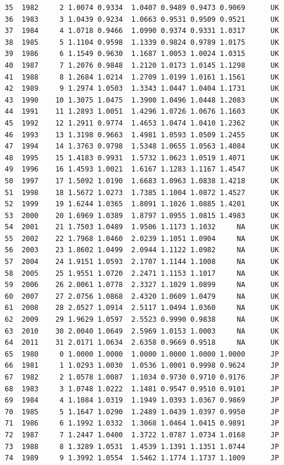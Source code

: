\documentclass[preprint,authoryear,12pt]{elsarticle}\usepackage{graphicx, color}
\makeatletter
\newenvironment{kframe}{%
 \def\at@end@of@kframe{}%
 \ifinner\ifhmode%
  \def\at@end@of@kframe{\end{minipage}}%
  \begin{minipage}{\columnwidth}%
 \fi\fi%
 \def\FrameCommand##1{\hskip\@totalleftmargin \hskip-\fboxsep
 \colorbox{shadecolor}{##1}\hskip-\fboxsep
     \hskip-\linewidth \hskip-\@totalleftmargin \hskip\columnwidth}%
 \MakeFramed {\advance\hsize-\width
   \@totalleftmargin\z@ \linewidth\hsize
   \@setminipage}}%
 {\par\unskip\endMakeFramed%
 \at@end@of@kframe}
\newenvironment{knitrout}{}{} %
\makeatother
\begin{document}
\begin{knitrout}
\begin{kframe}
\begin{verbatim}
35  1982     2 1.0074 0.9334  1.0407 0.9489 0.9473 0.9069      UK
36  1983     3 1.0439 0.9234  1.0663 0.9531 0.9509 0.9521      UK
37  1984     4 1.0718 0.9466  1.0990 0.9374 0.9331 1.0317      UK
38  1985     5 1.1104 0.9598  1.1339 0.9824 0.9789 1.0175      UK
39  1986     6 1.1549 0.9630  1.1687 1.0053 1.0024 1.0315      UK
40  1987     7 1.2076 0.9848  1.2120 1.0173 1.0145 1.1298      UK
41  1988     8 1.2684 1.0214  1.2709 1.0199 1.0161 1.1561      UK
42  1989     9 1.2974 1.0503  1.3343 1.0447 1.0404 1.1731      UK
43  1990    10 1.3075 1.0475  1.3900 1.0496 1.0448 1.2083      UK
44  1991    11 1.2893 1.0051  1.4296 1.0726 1.0676 1.1603      UK
45  1992    12 1.2911 0.9774  1.4653 1.0474 1.0410 1.2362      UK
46  1993    13 1.3198 0.9663  1.4981 1.0593 1.0509 1.2455      UK
47  1994    14 1.3763 0.9798  1.5348 1.0655 1.0563 1.4084      UK
48  1995    15 1.4183 0.9931  1.5732 1.0623 1.0519 1.4071      UK
49  1996    16 1.4593 1.0021  1.6167 1.1283 1.1167 1.4547      UK
50  1997    17 1.5092 1.0190  1.6683 1.0963 1.0838 1.4218      UK
51  1998    18 1.5672 1.0273  1.7385 1.1004 1.0872 1.4527      UK
52  1999    19 1.6244 1.0365  1.8091 1.1026 1.0885 1.4201      UK
53  2000    20 1.6969 1.0389  1.8797 1.0955 1.0815 1.4983      UK
54  2001    21 1.7503 1.0489  1.9506 1.1173 1.1032     NA      UK
55  2002    22 1.7968 1.0460  2.0239 1.1051 1.0904     NA      UK
56  2003    23 1.8602 1.0499  2.0944 1.1122 1.0982     NA      UK
57  2004    24 1.9151 1.0593  2.1707 1.1144 1.1008     NA      UK
58  2005    25 1.9551 1.0720  2.2471 1.1153 1.1017     NA      UK
59  2006    26 2.0061 1.0778  2.3327 1.1029 1.0899     NA      UK
60  2007    27 2.0756 1.0868  2.4320 1.0609 1.0479     NA      UK
61  2008    28 2.0527 1.0914  2.5117 1.0494 1.0360     NA      UK
62  2009    29 1.9629 1.0597  2.5523 0.9990 0.9838     NA      UK
63  2010    30 2.0040 1.0649  2.5969 1.0153 1.0003     NA      UK
64  2011    31 2.0171 1.0634  2.6358 0.9669 0.9518     NA      UK
65  1980     0 1.0000 1.0000  1.0000 1.0000 1.0000 1.0000      JP
66  1981     1 1.0293 1.0030  1.0536 1.0001 0.9998 0.9624      JP
67  1982     2 1.0578 1.0087  1.1034 0.9730 0.9710 0.9176      JP
68  1983     3 1.0748 1.0222  1.1481 0.9547 0.9510 0.9101      JP
69  1984     4 1.1084 1.0319  1.1949 1.0393 1.0367 0.9869      JP
70  1985     5 1.1647 1.0290  1.2489 1.0439 1.0397 0.9950      JP
71  1986     6 1.1992 1.0332  1.3068 1.0464 1.0415 0.9891      JP
72  1987     7 1.2447 1.0400  1.3722 1.0787 1.0734 1.0168      JP
73  1988     8 1.3289 1.0531  1.4539 1.1391 1.1351 1.0744      JP
74  1989     9 1.3992 1.0554  1.5462 1.1774 1.1737 1.1009      JP

\end{verbatim}
\end{kframe}
\end{knitrout}
\end{document}
